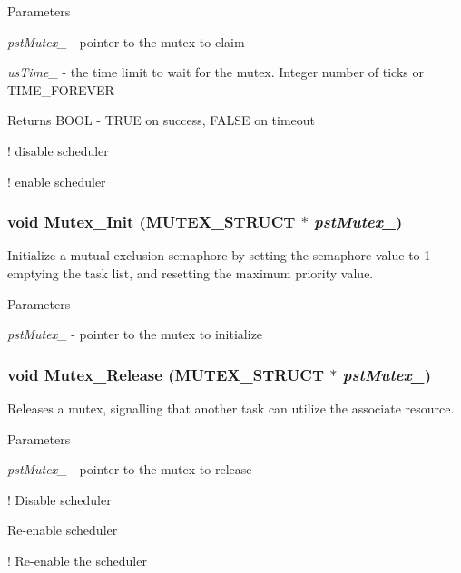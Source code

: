 \begin{DoxyParams}{Parameters}
\item[{\em pstMutex\_\-}]-\/ pointer to the mutex to claim \item[{\em usTime\_\-}]-\/ the time limit to wait for the mutex. Integer number of ticks or TIME\_\-FOREVER \end{DoxyParams}
\begin{DoxyReturn}{Returns}
BOOL -\/ TRUE on success, FALSE on timeout 
\end{DoxyReturn}


! disable scheduler

! enable scheduler 
\subsubsection[{Mutex\_\-Init}]{\setlength{\rightskip}{0pt plus 5cm}void Mutex\_\-Init ({\bf MUTEX\_\-STRUCT} $\ast$ {\em pstMutex\_\-})}\label{mutex_8h_a333ae96348afa66617d6a7240ce0aa12}
Initialize a mutual exclusion semaphore by setting the semaphore value to 1 emptying the task list, and resetting the maximum priority value.


\begin{DoxyParams}{Parameters}
\item[{\em pstMutex\_\-}]-\/ pointer to the mutex to initialize \end{DoxyParams}
\subsubsection[{Mutex\_\-Release}]{\setlength{\rightskip}{0pt plus 5cm}void Mutex\_\-Release ({\bf MUTEX\_\-STRUCT} $\ast$ {\em pstMutex\_\-})}\label{mutex_8h_ad0715c4836a6335db7520189b1f64348}
Releases a mutex, signalling that another task can utilize the associate resource.


\begin{DoxyParams}{Parameters}
\item[{\em pstMutex\_\-}]-\/ pointer to the mutex to release \end{DoxyParams}


! Disable scheduler

Re-\/enable scheduler

! Re-\/enable the scheduler 